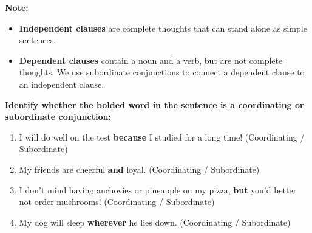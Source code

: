 \documentclass[12pt]{article}
\begin{document}
\vspace{1em}

\begin{tcolorbox}[colframe=black!40, colback=gray!5, 
coltitle=black, colbacktitle=black!20, fonttitle=\bfseries\Large, 
title=Additional Notes, halign title=center, left=5pt, right=5pt, top=5pt, bottom=15pt]
\textbf{Note:}
\begin{itemize}
    \item \textbf{Independent clauses} are complete thoughts that can stand alone as simple sentences.
    \item \textbf{Dependent clauses} contain a noun and a verb, but are not complete thoughts. We use subordinate conjunctions to connect a dependent clause to an independent clause. 


\end{itemize}
\end{tcolorbox}

\vspace{1em}

\begin{tcolorbox}[colframe=black!60, colback=white, 
coltitle=black, colbacktitle=black!15, fonttitle=\bfseries\Large, 
title=Independent Practice, halign title=center, left=10pt, right=10pt, top=10pt, bottom=15pt]
\textbf{Identify whether the bolded word in the sentence is a coordinating or subordinate conjunction:}
\begin{enumerate}[itemsep=3em] %
    \item I will do well on the test \textbf{because} I studied for a long time! (Coordinating / Subordinate)
    \item    My friends are cheerful \textbf{and} loyal. (Coordinating / Subordinate)
    \item I don't mind having anchovies or pineapple on my pizza, \textbf{but} you'd better not order mushrooms!   (Coordinating / Subordinate)
    \item My dog will sleep \textbf{wherever} he lies down. (Coordinating / Subordinate)
\end{enumerate}
\end{tcolorbox}

\vspace{1em}
\end{document}
